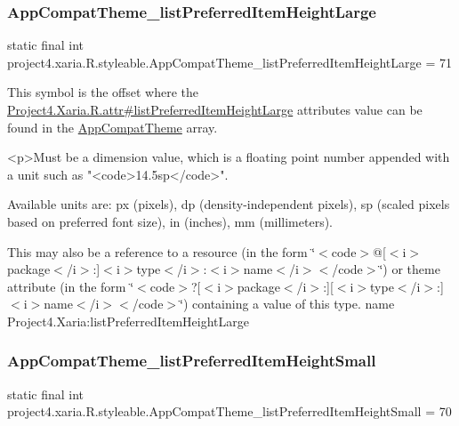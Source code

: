 \subsubsection{\texorpdfstring{App\+Compat\+Theme\+\_\+list\+Preferred\+Item\+Height\+Large}{AppCompatTheme\_listPreferredItemHeightLarge}}
{\footnotesize\ttfamily static final int project4.\+xaria.\+R.\+styleable.\+App\+Compat\+Theme\+\_\+list\+Preferred\+Item\+Height\+Large = 71\hspace{0.3cm}{\ttfamily [static]}}

This symbol is the offset where the \hyperlink{}{Project4.\+Xaria.\+R.\+attr\#list\+Preferred\+Item\+Height\+Large} attribute\textquotesingle{}s value can be found in the \hyperlink{classproject4_1_1xaria_1_1R_1_1styleable_aad8bec413e2350f9404e6ff0e831a85d}{App\+Compat\+Theme} array.

\begin{DoxyVerb}      <p>Must be a dimension value, which is a floating point number appended with a unit such as "<code>14.5sp</code>".
\end{DoxyVerb}
 Available units are\+: px (pixels), dp (density-\/independent pixels), sp (scaled pixels based on preferred font size), in (inches), mm (millimeters). 

This may also be a reference to a resource (in the form \char`\"{}$<$code$>$@\mbox{[}$<$i$>$package$<$/i$>$\+:\mbox{]}$<$i$>$type$<$/i$>$\+:$<$i$>$name$<$/i$>$$<$/code$>$\char`\"{}) or theme attribute (in the form \char`\"{}$<$code$>$?\mbox{[}$<$i$>$package$<$/i$>$\+:\mbox{]}\mbox{[}$<$i$>$type$<$/i$>$\+:\mbox{]}$<$i$>$name$<$/i$>$$<$/code$>$\char`\"{}) containing a value of this type.  name Project4.\+Xaria\+:list\+Preferred\+Item\+Height\+Large \mbox{\label{classproject4_1_1xaria_1_1R_1_1styleable_af5bdb2bf5ceb768d50348bb1dc8c469d}} 
\subsubsection{\texorpdfstring{App\+Compat\+Theme\+\_\+list\+Preferred\+Item\+Height\+Small}{AppCompatTheme\_listPreferredItemHeightSmall}}
{\footnotesize\ttfamily static final int project4.\+xaria.\+R.\+styleable.\+App\+Compat\+Theme\+\_\+list\+Preferred\+Item\+Height\+Small = 70\hspace{0.3cm}{\ttfamily [static]}}

